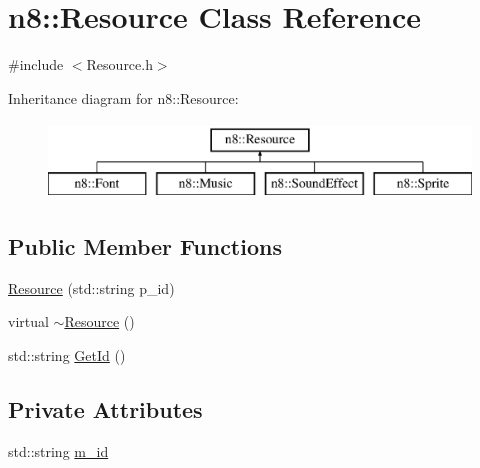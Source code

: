 \hypertarget{classn8_1_1_resource}{\section{n8\-:\-:Resource Class Reference}
\label{classn8_1_1_resource}
}


{\ttfamily \#include $<$Resource.\-h$>$}

Inheritance diagram for n8\-:\-:Resource\-:\begin{figure}[H]
\begin{center}
\leavevmode
\includegraphics[height=2.000000cm]{classn8_1_1_resource}
\end{center}
\end{figure}
\subsection*{Public Member Functions}
\begin{DoxyCompactItemize}
\item 
\hyperlink{classn8_1_1_resource_ab779e9e31d429663b16d7d891494da7c}{Resource} (std\-::string p\-\_\-id)
\item 
virtual \hyperlink{classn8_1_1_resource_a238b22c42b4a9bc86509ed9c36bc4d2e}{$\sim$\-Resource} ()
\item 
std\-::string \hyperlink{classn8_1_1_resource_a18baa304ac93bd0b94b368ae64282f54}{Get\-Id} ()
\end{DoxyCompactItemize}
\subsection*{Private Attributes}
\begin{DoxyCompactItemize}
\item 
std\-::string \hyperlink{classn8_1_1_resource_a7a80eb975bb76b4e8c5b3b60de210f23}{m\-\_\-id}
\end{DoxyCompactItemize}


